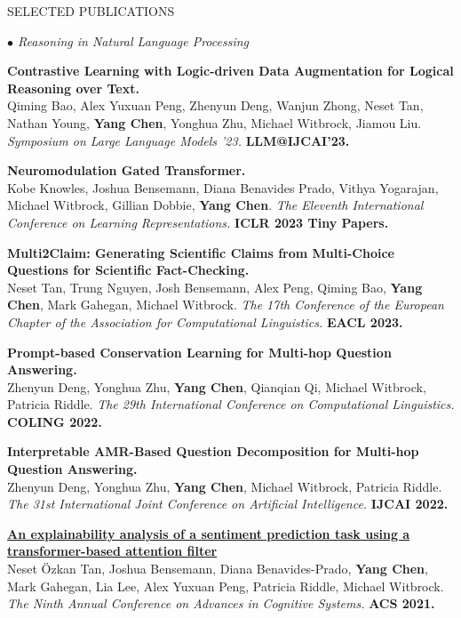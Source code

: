 \documentclass{resume} %
\begin{document}
\begin{rSection}{SELECTED PUBLICATIONS}
\begin{rSubsection}{\large\em $\bullet$ Reasoning in Natural Language Processing}{}{}{}
\item {\bf Contrastive Learning with Logic-driven Data Augmentation for Logical Reasoning over Text.}\\
Qiming Bao, Alex Yuxuan Peng, Zhenyun Deng, Wanjun Zhong, Neset Tan, Nathan Young, \textbf{Yang Chen}, Yonghua Zhu, Michael Witbrock, Jiamou Liu. {\em Symposium on Large Language Models \@IJCAI'23.} {\bf LLM@IJCAI'23.}\\
\item {\bf Neuromodulation Gated Transformer.}\\
Kobe Knowles, Joshua Bensemann, Diana Benavides Prado, Vithya Yogarajan, Michael Witbrock, Gillian Dobbie, \textbf{Yang Chen}. {\em The Eleventh International Conference on Learning Representations.} {\bf ICLR 2023 Tiny Papers.}\\
\item {\bf Multi2Claim: Generating Scientific Claims from Multi-Choice Questions for Scientific Fact-Checking.}\\
Neset Tan, Trung Nguyen, Josh Bensemann, Alex Peng, Qiming Bao, \textbf{Yang Chen}, Mark Gahegan, Michael Witbrock. {\em The 17th Conference of the European Chapter of the Association for Computational Linguistics.} {\bf EACL 2023.}\\
\item {\bf Prompt-based Conservation  Learning for Multi-hop Question Answering.}\\
Zhenyun Deng, Yonghua Zhu, \textbf{Yang Chen}, Qianqian Qi, Michael Witbrock, Patricia Riddle. {\em The 29th International Conference on Computational Linguistics.} \textbf{COLING 2022.}\\
\item {\bf Interpretable AMR-Based Question Decomposition for Multi-hop Question Answering.}\\
		Zhenyun Deng, Yonghua Zhu, \textbf{Yang Chen}, Michael Witbrock, Patricia Riddle. {\em The 31st International Joint Conference on Artificial Intelligence.} \textbf{IJCAI 2022.}\\
\item {\href{https://advancesincognitivesystems.github.io/acs2021/data/ACS-21_paper_22.pdf}{\bf An explainability analysis of a sentiment prediction task using a transformer-based attention filter}}\\
		Neset \"{O}zkan Tan, Joshua Bensemann, Diana Benavides-Prado, \textbf{Yang Chen}, Mark Gahegan, Lia Lee, Alex Yuxuan Peng, Patricia Riddle, Michael Witbrock. {\em The Ninth Annual Conference on Advances in Cognitive Systems.} \textbf{ACS 2021.}\\

\end{rSubsection}
\end{rSection}
\end{document}
